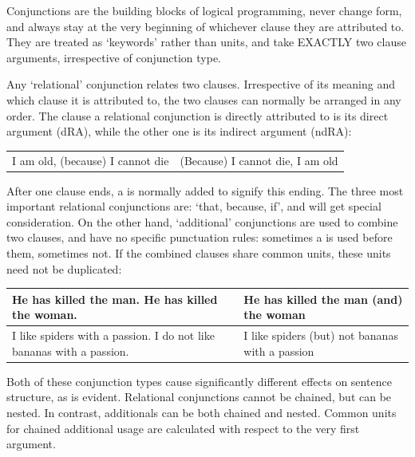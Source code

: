 Conjunctions are the building blocks of logical programming, never change form, and always stay at the very beginning of whichever clause they are attributed to. They are treated as `keywords' rather than units, and take EXACTLY two clause arguments, irrespective of conjunction type.

Any `relational' conjunction relates two clauses.  Irrespective of its meaning and which clause it is attributed to, the two clauses can normally be arranged in any order. The clause a relational conjunction is directly attributed to is its direct argument (dRA), while the other one is its indirect argument (ndRA):
\begin{example}
    \begin{tabular}{c|c}
    I am old, (because) I cannot die & (Because) I cannot die, I am old
    \end{tabular}
\end{example}
After one clause ends, a  is normally added to signify this ending. The three most important relational conjunctions are: `that, because, if', and will get special consideration. On the other hand, `additional' conjunctions are used to combine two  clauses, and have no specific punctuation rules: sometimes a  is used before them, sometimes not. If the combined clauses share common units, these units need not be duplicated:
\begin{example}
    \begin{tabular}{m{7cm}|m{6cm}}
        He has killed the man. He has killed the woman. & He has killed the man (and) the woman\\\hline
        I like spiders with a passion. I do not like bananas with a passion. & I like spiders (but) not bananas with a passion
    \end{tabular}
\end{example}
Both of these conjunction types cause significantly different effects on sentence structure, as is evident. Relational conjunctions cannot be chained, but  can be nested. In contrast,  additionals can be both chained and nested. Common units for chained additional usage are  calculated with respect to the very first argument.

